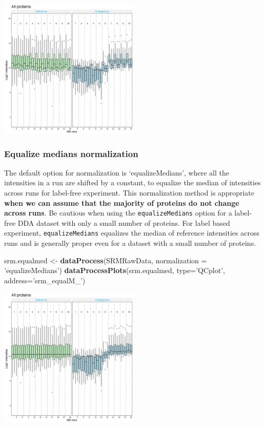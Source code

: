 \documentclass[]{book}
\newenvironment{Shaded}{\begin{snugshade}}{\end{snugshade}}
\newcommand{\DataTypeTok}[1]{\textcolor[rgb]{0.13,0.29,0.53}{#1}}
\newcommand{\KeywordTok}[1]{\textcolor[rgb]{0.13,0.29,0.53}{\textbf{#1}}}
\newcommand{\NormalTok}[1]{#1}
\newcommand{\StringTok}[1]{\textcolor[rgb]{0.31,0.60,0.02}{#1}}
\begin{document}
\includegraphics[width=0.5\textwidth,height=\textheight]{img/srm_noNorm_QCPlot.png}

\hypertarget{equalize-medians-normalization}{%
\subsubsection{Equalize medians normalization}\label{equalize-medians-normalization}}

The default option for normalization is `equalizeMedians', where all the
intensities in a run are shifted by a constant, to equalize the median of intensities across runs for
label-free experiment. This normalization method is appropriate \textbf{when we can assume that the
majority of proteins do not change across runs}. Be cautious when using the \texttt{equalizeMedians}
option for a label-free DDA dataset with only a small number of proteins. For label based experiment,
\texttt{equalizeMedians} equalizes the median of reference intensities across runs and is generally proper
even for a dataset with a small number of proteins.

\begin{Shaded}
\begin{Highlighting}[]
\NormalTok{srm.equalmed <-}\StringTok{ }\KeywordTok{dataProcess}\NormalTok{(SRMRawData, }\DataTypeTok{normalization =} \StringTok{'equalizeMedians'}\NormalTok{)}
\KeywordTok{dataProcessPlots}\NormalTok{(srm.equalmed, }\DataTypeTok{type=}\StringTok{'QCplot'}\NormalTok{, }\DataTypeTok{address=}\StringTok{'srm_equalM_'}\NormalTok{)}
\end{Highlighting}
\end{Shaded}

\includegraphics[width=0.5\textwidth,height=\textheight]{img/srm_equalM_QCPlot.png}
\end{document}
